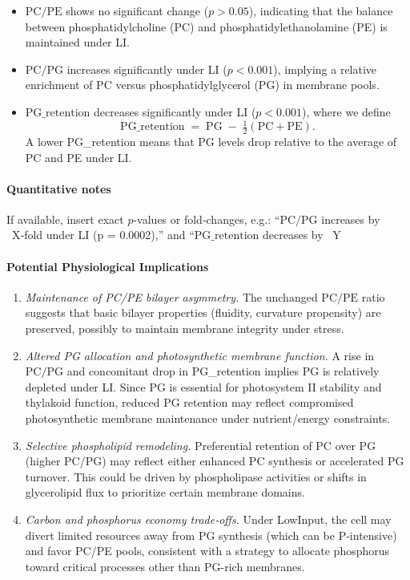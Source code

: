\documentclass[10pt,letterpaper]{article}
\begin{document}
\begin{itemize}
  \item \textbf{\(\mathrm{PC/PE}\)} shows no significant change (\(p>0.05\)), indicating that the balance between phosphatidylcholine (PC) and phosphatidylethanolamine (PE) is maintained under LI.
  \item \textbf{\(\mathrm{PC/PG}\)} increases significantly under LI (\(p<0.001\)), implying a relative enrichment of PC versus phosphatidylglycerol (PG) in membrane pools.
  \item \textbf{\(\mathrm{PG\_retention}\)} decreases significantly under LI (\(p<0.001\)), where we define 
    \[
      \mathrm{PG\_retention} \;=\; \mathrm{PG} \;-\; \tfrac{1}{2}(\mathrm{PC} + \mathrm{PE}).
    \]
    A lower PG_retention means that PG levels drop relative to the average of PC and PE under LI.
\end{itemize}

\paragraph{Quantitative notes}
If available, insert exact \(p\)-values or fold‐changes, e.g.: “\(\mathrm{PC/PG}\) increases by ~X‑fold under LI (p = 0.0002),” and “\(\mathrm{PG\_retention}\) decreases by ~Y%

\paragraph{Potential Physiological Implications}
\begin{enumerate}
  \item \textit{Maintenance of PC/PE bilayer asymmetry.}  
        The unchanged \(\mathrm{PC/PE}\) ratio suggests that basic bilayer properties (fluidity, curvature propensity) are preserved, possibly to maintain membrane integrity under stress.
  \item \textit{Altered PG allocation and photosynthetic membrane function.}  
        A rise in \(\mathrm{PC/PG}\) and concomitant drop in PG_retention implies PG is relatively depleted under LI. Since PG is essential for photosystem II stability and thylakoid function, reduced PG retention may reflect compromised photosynthetic membrane maintenance under nutrient/energy constraints.
  \item \textit{Selective phospholipid remodeling.}  
        Preferential retention of PC over PG (higher PC/PG) may reflect either enhanced PC synthesis or accelerated PG turnover. This could be driven by phospholipase activities or shifts in glycerolipid flux to prioritize certain membrane domains.
  \item \textit{Carbon and phosphorus economy trade‑offs.}  
        Under LowInput, the cell may divert limited resources away from PG synthesis (which can be P‑intensive) and favor PC/PE pools, consistent with a strategy to allocate phosphorus toward critical processes other than PG-rich membranes.
\end{enumerate}
\end{document}
